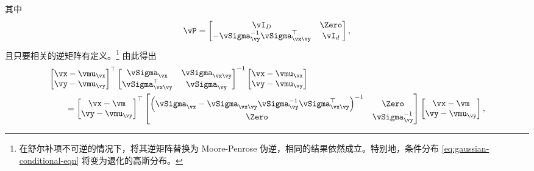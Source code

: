 \documentclass[../../book-main_zh.tex]{subfiles}
\begin{document}
\begin{exercise}
\begin{enumerate}
\begin{equation}
            \end{equation}
            其中
            \begin{equation}
                \vP =
                \begin{bmatrix}
                    \vI_D & \Zero\\
                    -\vSigma_{\vy}^{-1}\vSigma_{\vx\vy}^\top & \vI_d
                \end{bmatrix},
            \end{equation}
            且只要相关的逆矩阵有定义。\footnote{在舒尔补项不可逆的情况下，将其逆矩阵替换为 Moore-Penrose 伪逆，相同的结果依然成立。特别地，条件分布 \eqref{eq:gaussian-conditional-eqn} 将变为退化的高斯分布。}
            由此得出
            \begin{align}
                &
                \begin{bmatrix}
                    \vx-\vmu_{\vx} \\
                    \vy-\vmu_{\vy}
                \end{bmatrix}^{\top}
                \begin{bmatrix}
                    \vSigma_{\vx} & \vSigma_{\vx\vy} \\
                    \vSigma_{\vx\vy}^\top & \vSigma_{\vy}
                \end{bmatrix}^{-1}
                \begin{bmatrix}
                    \vx-\vmu_{\vx} \\
                    \vy-\vmu_{\vy}
                \end{bmatrix}
                \\
                &\qquad=
                \begin{bmatrix}
                    \vx - \vm \\
                    \vy - \vmu_{\vy}
                \end{bmatrix}^\top
                \begin{bmatrix}
                    \left(\vSigma_{\vx} - \vSigma_{\vx\vy}
                        \vSigma_{\vy}^{-1}
                    \vSigma_{\vx\vy}^{\top}\right)^{-1} & \Zero \\
                    \Zero & \vSigma_{\vy}^{-1}
                \end{bmatrix}
                \begin{bmatrix}
                    \vx - \vm \\
                    \vy - \vmu_{\vy}
                \end{bmatrix},

\end{align}
\end{enumerate}
\end{exercise}
\end{document}
